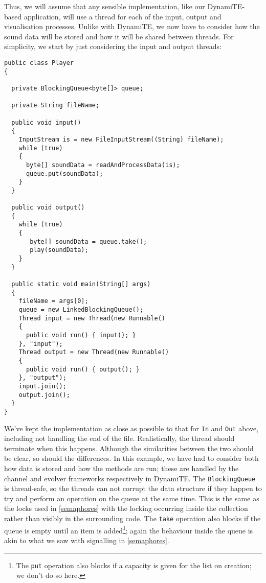 Thus, we will assume that any sensible implementation, like our
DynamiTE-based application, will use a thread for each of the input,
output and visualisation processes.  Unlike with DynamiTE, we now have
to consider how the sound data will be stored and how it will be
shared between threads.  For simplicity, we start by just considering
the input and output threads:

\begin{verbatim}
public class Player
{

  private BlockingQueue<byte[]> queue;

  private String fileName;

  public void input()
  {
    InputStream is = new FileInputStream((String) fileName);
    while (true)
    {
      byte[] soundData = readAndProcessData(is);
      queue.put(soundData);
    }
  }

  public void output()
  {
    while (true)
    {
       byte[] soundData = queue.take();
       play(soundData);
    }
  }

  public static void main(String[] args)
  {
    fileName = args[0];
    queue = new LinkedBlockingQueue();
    Thread input = new Thread(new Runnable()
    {
      public void run() { input(); }
    }, "input");
    Thread output = new Thread(new Runnable()
    {
      public void run() { output(); }
    }, "output");
    input.join();
    output.join();
  }
}     
\end{verbatim}

We've kept the implementation as close as possible to that for
\texttt{In} and \texttt{Out} above, including not handling the end of
the file.  Realistically, the thread should terminate when this
happens.  Although the similarities between the two should be clear,
so should the differences.  In this example, we have had to consider
both how data is stored and how the methods are run; these are handled
by the channel and evolver frameworks respectively in DynamiTE.  The
\texttt{BlockingQueue} is thread-safe, so the threads can not corrupt
the data structure if they happen to try and perform an operation on
the queue at the same time.  This is the same as the locks used in
\ref{semaphores} with the locking occurring inside the collection
rather than visibly in the surrounding code.  The \texttt{take}
operation also blocks if the queue is empty until an item is
added\footnote{The \texttt{put} operation also blocks if a capacity is
  given for the list on creation; we don't do so here.}; again the
behaviour inside the queue is akin to what we saw with signalling in
\ref{semaphores}.

